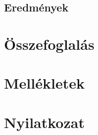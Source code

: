 \documentclass[12pt]{report}
\theoremstyle{definition}
\begin{document}
    \section{Eredmények}
    \label{sec:Eredmények}



    \chapter{Összefoglalás}



  {}
  



    \chapter*{Mellékletek}
    \newcommand{\thischaptertitle}{Mellékletek}


    \chapter*{Nyilatkozat}

\end{document}

